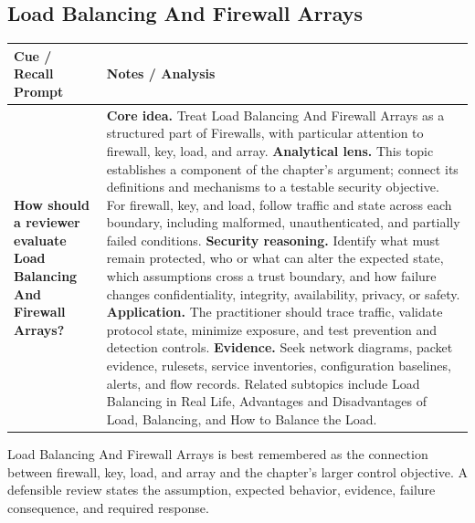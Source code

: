 \documentclass[11pt]{article}
\newcommand{\CornellHeader}{%
\rowcolor{Navy}\color{white}\bfseries Cue / Recall Prompt & \color{white}\bfseries Notes / Analysis\\\hline}
\newcommand{\CornellRow}[2]{%
\cellcolor{CueGray}\RaggedRight\textbf{#1} & \RaggedRight #2\\\hline}
\begin{document}
\subsection*{Load Balancing And Firewall Arrays}
\begin{longtable}{>{\RaggedRight\arraybackslash}p{}|>{\RaggedRight\arraybackslash}p{}}
\CornellHeader
\CornellRow{How should a reviewer evaluate Load Balancing And Firewall Arrays?}{\textbf{Core idea.} Treat Load Balancing And Firewall Arrays as a structured part of Firewalls, with particular attention to firewall, key, load, and array. \textbf{Analytical lens.} This topic establishes a component of the chapter's argument; connect its definitions and mechanisms to a testable security objective. For firewall, key, and load, follow traffic and state across each boundary, including malformed, unauthenticated, and partially failed conditions. \textbf{Security reasoning.} Identify what must remain protected, who or what can alter the expected state, which assumptions cross a trust boundary, and how failure changes confidentiality, integrity, availability, privacy, or safety. \textbf{Application.} The practitioner should trace traffic, validate protocol state, minimize exposure, and test prevention and detection controls. \textbf{Evidence.} Seek network diagrams, packet evidence, rulesets, service inventories, configuration baselines, alerts, and flow records. Related subtopics include Load Balancing in Real Life, Advantages and Disadvantages of Load, Balancing, and How to Balance the Load.}
\end{longtable}
\begin{topicsummary}
Load Balancing And Firewall Arrays is best remembered as the connection between firewall, key, load, and array and the chapter's larger control objective. A defensible review states the assumption, expected behavior, evidence, failure consequence, and required response.
\end{topicsummary}
\end{document}
